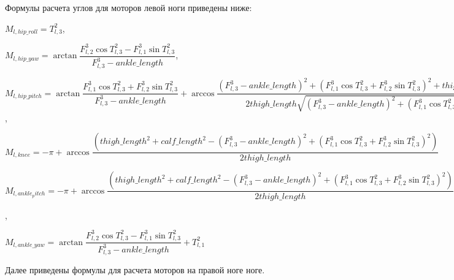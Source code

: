 Формулы расчета углов для моторов левой ноги приведены ниже:

\begin{center}
$M_{l,hip\_roll} = T^{2}_{l,3}$,

$M_{l,hip\_yaw} = \arctan \dfrac{F^{3}_{l,2} \cos T^{2}_{l,3} - F^{3}_{l,1} \sin T^{2}_{l,3}}{F^{3}_{l,3} - ankle\_length}$,

$M_{l,hip\_pitch} = \arctan \dfrac{  F^{3}_{l,1} \cos T^{2}_{l,3} + F^{3}_{l,2} \sin T^{2}_{l,3}  }{  F^{3}_{l,3} - ankle\_length  } + \arccos \dfrac{  (F^{3}_{l,3} - ankle\_length)^{2} + (F^{3}_{l,1} \cos T^{2}_{l,3} + F^{3}_{l,2} \sin T^{2}_{l,3}) ^ {2}  + thigh\_length^{2} - calf\_length ^ 2 }{ 2 thigh\_length \sqrt{(F^{3}_{l,3} - ankle\_length)^{2} + (F^{3}_{l,1} \cos T^{2}_{l,3} + F^{3}_{l,2} \sin T^{2}_{l,3}) ^ {2}}}$,

$M_{l,knee} = -\pi + \arccos \dfrac{(thigh\_length ^ {2} + calf\_length ^ {2} - (F^{3}_{l,3} - ankle\_length)^{2} + (F^{3}_{l,1} \cos T^{2}_{l,3} + F^{3}_{l,2} \sin T^{2}_{l,3}) ^ {2})} {2 thigh\_length} $

$M_{l,ankle_pitch} = -\pi + \arccos \dfrac{(thigh\_length ^ {2} + calf\_length ^ {2} - (F^{3}_{l,3} - ankle\_length)^{2} + (F^{3}_{l,1} \cos T^{2}_{l,3} + F^{3}_{l,2} \sin T^{2}_{l,3}) ^ {2})} {2 thigh\_length} + \arctan \dfrac{  F^{3}_{l,1} \cos T^{2}_{l,3} + F^{3}_{l,2} \sin T^{2}_{l,3}  }{  F^{3}_{l,3} - ankle\_length  } + \arccos \dfrac{  (F^{3}_{l,3} - ankle\_length)^{2} + (F^{3}_{l,1} \cos T^{2}_{l,3} + F^{3}_{l,2} \sin T^{2}_{l,3}) ^ {2}  + thigh\_length^{2} - calf\_length ^ 2 }{ 2 thigh\_length \sqrt{(F^{3}_{l,3} - ankle\_length)^{2} + (F^{3}_{l,1} \cos T^{2}_{l,3} + F^{3}_{l,2} \sin T^{2}_{l,3}) ^ {2}}} - T^{2}_{l,2}$,

$M_{l,ankle\_yaw} = \arctan \dfrac{F^{3}_{l,2} \cos T^{2}_{l,3} - F^{3}_{l,1} \sin T^{2}_{l,3}}{F^{3}_{l,3} - ankle\_length} + T^{2}_{l,1}$
\end{center}

Далее приведены формулы для расчета моторов на правой ноге ноге.

